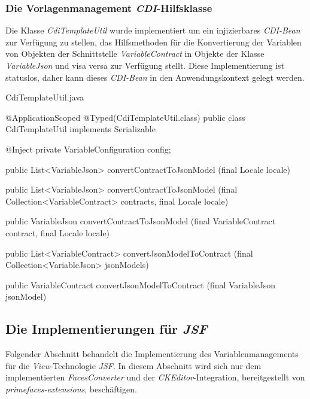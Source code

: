 \subsubsection{Die Vorlagenmanagement \emph{CDI}-Hilfsklasse}
Die Klasse \emph{CdiTemplateUtil} wurde implementiert um ein injizierbares \emph{CDI-Bean} zur Verfügung zu stellen, das Hilfsmethoden für die Konvertierung der Variablen von Objekten der Schnittstelle \emph{VariableContract} in Objekte der Klasse \emph{VariableJson} und visa versa zur Verfügung stellt. Diese Implementierung ist statuslos, daher kann dieses \emph{CDI-Bean} in den Anwendungskontext gelegt werden.
\begin{program}[h]
\caption{CdiTemplateUtil.java}
\label{prog:cdiTemplateUtil}
\begin{JavaCode}
@ApplicationScoped
@Typed(CdiTemplateUtil.class)
public class CdiTemplateUtil implements Serializable {

    @Inject
    private VariableConfiguration config;

    public List<VariableJson> convertContractToJsonModel
    						  (final Locale locale) {
    }

    public List<VariableJson> convertContractToJsonModel
    		(final Collection<VariableContract> contracts,
             final Locale locale) {
    }

    public VariableJson convertContractToJsonModel
           (final VariableContract contract,
            final Locale locale) {
    }
	
    public List<VariableContract> convertJsonModelToContract
    							 (final Collection<VariableJson> jsonModels) {
    }

    public VariableContract convertJsonModelToContract
                            (final VariableJson jsonModel) {
    }
}
\end{JavaCode}
\end{program}
\newpage
\subsection{Die Implementierungen für \emph{JSF}}
Folgender Abschnitt behandelt die Implementierung des Variablenmanagements für die \emph{View}-Technologie \emph{JSF}. In diesem Abschnitt wird sich nur dem implementierten \emph{FacesConverter} und der \emph{CKEditor}-Integration, bereitgestellt von \emph{primefaces-extensions}, beschäftigen.

